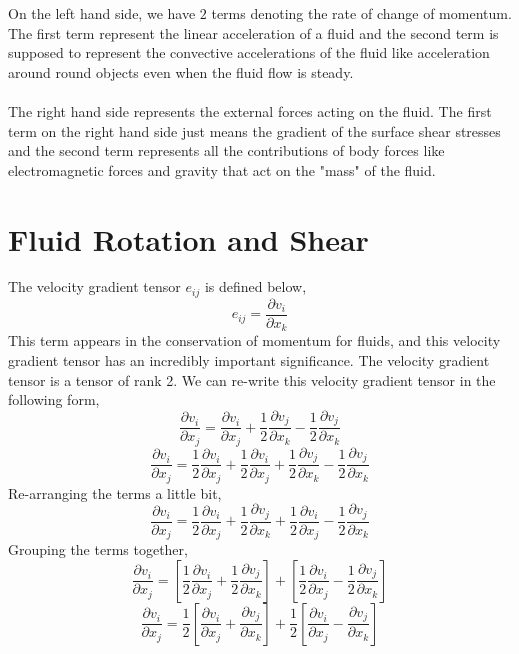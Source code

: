 On the left hand side, we have $2$ terms denoting the rate of change of momentum.
The first term represent the linear acceleration of a fluid and the second term is supposed to represent the convective accelerations of the fluid like acceleration around round objects even when the fluid flow is steady.
\\~\\The right hand side represents the external forces acting on the fluid.
The first term on the right hand side just means the gradient of the surface shear stresses and the second term represents all the contributions of body forces like electromagnetic forces and gravity that act on the "mass" of the fluid.

\section{Fluid Rotation and Shear}
\begin{comment}
\end{comment}
The velocity gradient tensor $e_{ij}$ is defined below,
$$e_{ij} = \frac{\partial v_{i}}{\partial x_{k}}$$
This term appears in the conservation of momentum for fluids, and this velocity gradient tensor has an incredibly important significance.
The velocity gradient tensor is a tensor of rank 2.
We can re-write this velocity gradient tensor in the following form,
$$\frac{\partial v_{i}}{\partial x_{j}} = \frac{\partial v_{i}}{\partial x_{j}} + \frac{1}{2}\frac{\partial v_{j}}{\partial x_{k}} - \frac{1}{2}\frac{\partial v_{j}}{\partial x_{k}}$$
$$\frac{\partial v_{i}}{\partial x_{j}} = \frac{1}{2}\frac{\partial v_{i}}{\partial x_{j}} + \frac{1}{2}\frac{\partial v_{i}}{\partial x_{j}} + \frac{1}{2}\frac{\partial v_{j}}{\partial x_{k}} - \frac{1}{2}\frac{\partial v_{j}}{\partial x_{k}}$$
Re-arranging the terms a little bit,
$$\frac{\partial v_{i}}{\partial x_{j}} = \frac{1}{2}\frac{\partial v_{i}}{\partial x_{j}} + \frac{1}{2}\frac{\partial v_{j}}{\partial x_{k}} + \frac{1}{2}\frac{\partial v_{i}}{\partial x_{j}} - \frac{1}{2}\frac{\partial v_{j}}{\partial x_{k}}$$
Grouping the terms together,
$$\frac{\partial v_{i}}{\partial x_{j}} = \left[\frac{1}{2}\frac{\partial v_{i}}{\partial x_{j}} + \frac{1}{2}\frac{\partial v_{j}}{\partial x_{k}}\right] + \left[\frac{1}{2}\frac{\partial v_{i}}{\partial x_{j}} - \frac{1}{2}\frac{\partial v_{j}}{\partial x_{k}}\right]$$
\begin{equation}\frac{\partial v_{i}}{\partial x_{j}} = \frac{1}{2}\left[\frac{\partial v_{i}}{\partial x_{j}} + \frac{\partial v_{j}}{\partial x_{k}}\right] + \frac{1}{2}\left[\frac{\partial v_{i}}{\partial x_{j}} - \frac{\partial v_{j}}{\partial x_{k}}\right] \label{raw decomposition of velocity gradient tensor Rotation and Shear}\end{equation}
